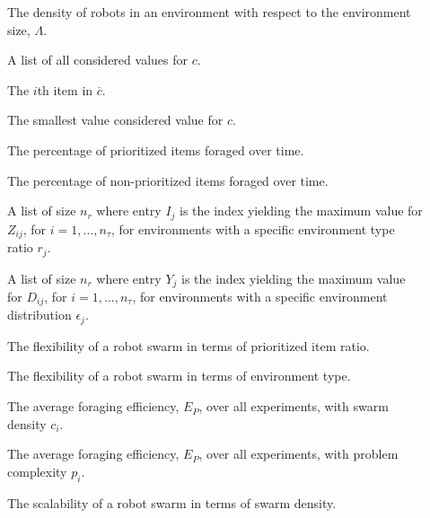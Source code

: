 \begin{description}
	\item[\parbox{\namewidth}{$c$}] The density of robots in an environment with respect to the environment size, $\Lambda$.

	\item[\parbox{\namewidth}{$\overline{c}$}] A list of all considered values for $c$.
	
	\item[\parbox{\namewidth}{$c_i$}] The $i$th item in $\overline{c}$.

	\item[\parbox{\namewidth}{$c_{min}$}] The smallest value considered value for $c$.
	
	\item[\parbox{\namewidth}{$E_P$}] The percentage of prioritized items foraged over time.

	\item[\parbox{\namewidth}{$E_{NP}$}] The percentage of non-prioritized items foraged over time.

	\item[\parbox{\namewidth}{$I$}] A list of size $n_r$ where entry $I_j$ is the index yielding the maximum value for $Z_{ij}$, for $i = 1,..., n_\tau$, for environments with a specific environment type ratio $r_j$.

	\item[\parbox{\namewidth}{$Y$}] A list of size $n_r$ where entry $Y_j$ is the index yielding the maximum value for $D_{ij}$, for $i = 1,..., n_\tau$, for environments with a specific environment distribution $\epsilon_j$.

	\item[\parbox{\namewidth}{$F_r$}] The flexibility of a robot swarm in terms of prioritized item ratio.
	
	\item[\parbox{\namewidth}{$F_\epsilon$}] The flexibility of a robot swarm in terms of environment type.

	\item[\parbox{\namewidth}{$E_{c_i}$}] The average foraging efficiency, $E_P$, over all experiments, with swarm density $c_i$.

	\item[\parbox{\namewidth}{$E_{p_i}$}] The average foraging efficiency, $E_P$, over all experiments, with problem complexity $p_i$.

	\item[\parbox{\namewidth}{$S_c$}] The scalability of a robot swarm in terms of swarm density.	
	

\end{description}
